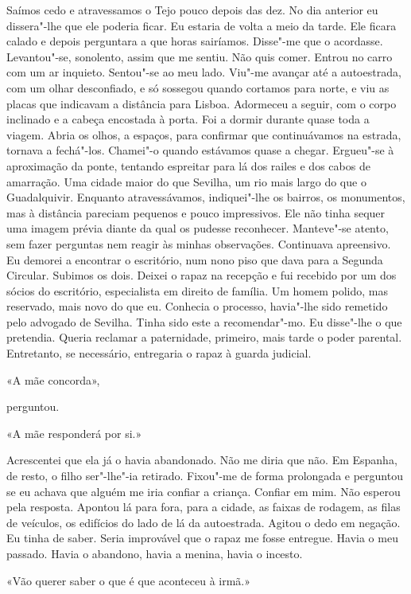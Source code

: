 Saímos cedo e atravessamos o Tejo pouco depois das dez. No dia anterior
eu dissera"-lhe que ele poderia ficar. Eu estaria de volta a meio da
tarde. Ele ficara calado e depois perguntara a que horas sairíamos.
Disse"-me que o acordasse. Levantou"-se, sonolento, assim que me sentiu.
Não quis comer. Entrou no carro com um ar inquieto. Sentou"-se ao meu
lado. Viu"-me avançar até a autoestrada, com um olhar desconfiado, e
só sossegou quando cortamos para norte, e viu as placas que indicavam a
distância para Lisboa. Adormeceu a seguir, com o corpo inclinado e a
cabeça encostada à porta. Foi a dormir durante quase toda a viagem.
Abria os olhos, a espaços, para confirmar que continuávamos na estrada,
tornava a fechá"-los. Chamei"-o quando estávamos quase a chegar.
Ergueu"-se à aproximação da ponte, tentando espreitar para lá dos railes
e dos cabos de amarração. Uma cidade maior do que Sevilha, um rio mais
largo do que o Guadalquivir. Enquanto atravessávamos, indiquei"-lhe os
bairros, os monumentos, mas à distância pareciam pequenos e pouco
impressivos. Ele não tinha sequer uma imagem prévia diante da qual os
pudesse reconhecer. Manteve"-se atento, sem fazer perguntas nem reagir
às minhas observações. Continuava apreensivo. Eu demorei a encontrar o
escritório, num nono piso que dava para a Segunda Circular. Subimos os
dois. Deixei o rapaz na recepção e fui recebido por um dos sócios do
escritório, especialista em direito de família. Um homem polido, mas
reservado, mais novo do que eu. Conhecia o processo, havia"-lhe sido
remetido pelo advogado de Sevilha. Tinha sido este a recomendar"-mo. Eu
disse"-lhe o que pretendia. Queria reclamar a paternidade, primeiro,
mais tarde o poder parental. Entretanto, se necessário, entregaria o
rapaz à guarda judicial.

«A mãe concorda»,

perguntou.

«A mãe responderá por si.»

Acrescentei que ela já o havia abandonado. Não me diria que não. Em
Espanha, de resto, o filho ser"-lhe"-ia retirado. Fixou"-me de forma
prolongada e perguntou se eu achava que alguém me iria confiar a
criança. Confiar em mim. Não esperou pela resposta. Apontou lá para
fora, para a cidade, as faixas de rodagem, as filas de veículos, os
edifícios do lado de lá da autoestrada. Agitou o dedo em negação. Eu
tinha de saber. Seria improvável que o rapaz me fosse entregue. Havia o
meu passado. Havia o abandono, havia a menina, havia o incesto.

«Vão querer saber o que é que aconteceu à irmã.»

